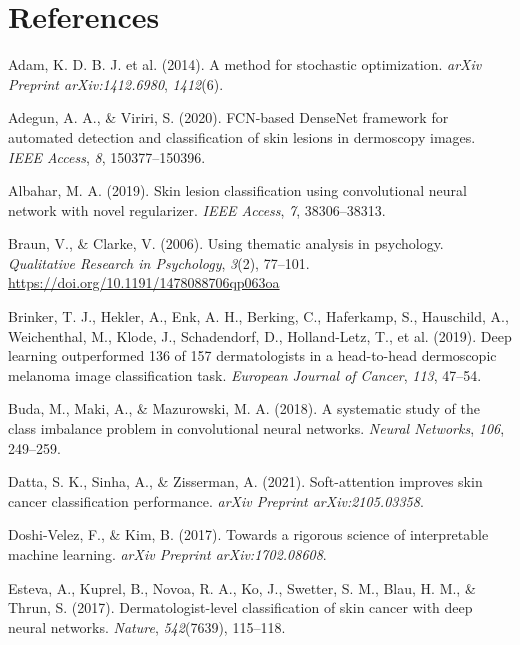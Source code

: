 \documentclass[
  12pt,
  oneside]{article}
\newlength{\cslhangindent}
\newenvironment{CSLReferences}[2] %
 {\begin{list}{}{%
  \setlength{\itemindent}{0pt}
  \setlength{\leftmargin}{0pt}
  \setlength{\parsep}{0pt}
  \ifodd #1
   \setlength{\leftmargin}{\cslhangindent}
   \setlength{\itemindent}{-1\cslhangindent}
  \fi
  \setlength{\itemsep}{#2\baselineskip}}}
 {\end{list}}
\begin{document}
\newpage

\section*{References}\label{references}

\label{refs}
\begin{CSLReferences}{1}{0}
Adam, K. D. B. J. et al. (2014). A method for stochastic optimization.
\emph{arXiv Preprint arXiv:1412.6980}, \emph{1412}(6).

Adegun, A. A., \& Viriri, S. (2020). FCN-based DenseNet framework for
automated detection and classification of skin lesions in dermoscopy
images. \emph{IEEE Access}, \emph{8}, 150377--150396.

Albahar, M. A. (2019). Skin lesion classification using convolutional
neural network with novel regularizer. \emph{IEEE Access}, \emph{7},
38306--38313.

Braun, V., \& Clarke, V. (2006). Using thematic analysis in psychology.
\emph{Qualitative Research in Psychology}, \emph{3}(2), 77--101.
\url{https://doi.org/10.1191/1478088706qp063oa}

Brinker, T. J., Hekler, A., Enk, A. H., Berking, C., Haferkamp, S.,
Hauschild, A., Weichenthal, M., Klode, J., Schadendorf, D.,
Holland-Letz, T., et al. (2019). Deep learning outperformed 136 of 157
dermatologists in a head-to-head dermoscopic melanoma image
classification task. \emph{European Journal of Cancer}, \emph{113},
47--54.

Buda, M., Maki, A., \& Mazurowski, M. A. (2018). A systematic study of
the class imbalance problem in convolutional neural networks.
\emph{Neural Networks}, \emph{106}, 249--259.

Datta, S. K., Sinha, A., \& Zisserman, A. (2021). Soft-attention
improves skin cancer classification performance. \emph{arXiv Preprint
arXiv:2105.03358}.

Doshi-Velez, F., \& Kim, B. (2017). Towards a rigorous science of
interpretable machine learning. \emph{arXiv Preprint arXiv:1702.08608}.

Esteva, A., Kuprel, B., Novoa, R. A., Ko, J., Swetter, S. M., Blau, H.
M., \& Thrun, S. (2017). Dermatologist-level classification of skin
cancer with deep neural networks. \emph{Nature}, \emph{542}(7639),
115--118.


\end{CSLReferences}
\end{document}
